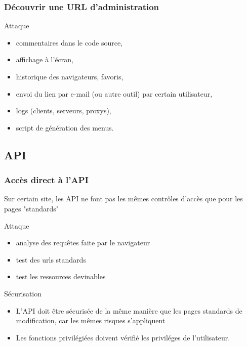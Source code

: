 \documentclass{beamer}
\begin{document}
\begin{frame}
  \frametitle{Découvrir une URL d'administration}
  \begin{alertblock}{Attaque}
    \begin{itemize}
      \item commentaires dans le code source,
      \item affichage à l'écran, 
      \item historique des navigateurs, favoris,
      \item envoi du lien par e-mail (ou autre outil) par certain utilisateur,
      \item logs (clients, serveurs, proxys), 
      \item script de génération des menus.
    \end{itemize}
  \end{alertblock}
\end{frame}
  
\subsection{API}
\begin{frame}
  \frametitle{Accès direct à l'API}
  Sur certain site, les API ne font pas les mêmes contrôles d'accès que pour les pages "standards"
  \begin{alertblock}{Attaque}
    \begin{itemize}
      \item analyse des requêtes faite par le navigateur
      \item test des urls standards
      \item test les ressources devinables
    \end{itemize}
  \end{alertblock}
  \begin{exampleblock}{Sécurisation}
    \begin{itemize}
      \item L'API doit être sécurisée de la même manière que les pages standards de modification, car les mêmes risques s'appliquent
      \item Les fonctions privilégiées doivent vérifié les priviléges de l’utilisateur.
    \end{itemize}
  \end{exampleblock}
\end{frame}
\end{document}
